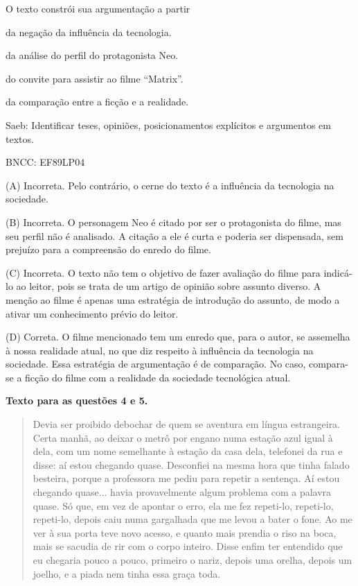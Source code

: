 O texto constrói sua argumentação a partir

\begin{escolha}
\item da negação da influência da tecnologia.

\item da análise do perfil do protagonista Neo.

\item do convite para assistir ao filme ``Matrix''.

\item da comparação entre a ficção e a realidade.
\end{escolha}

Saeb: Identificar teses, opiniões, posicionamentos explícitos e
argumentos em textos.

BNCC: EF89LP04

(A) Incorreta. Pelo contrário, o cerne do texto é a influência da
tecnologia na sociedade.

(B) Incorreta. O personagem Neo é citado por ser o protagonista do
filme, mas seu perfil não é analisado. A citação a ele é curta e poderia
ser dispensada, sem prejuízo para a compreensão do enredo do filme.

(C) Incorreta. O texto não tem o objetivo de fazer avaliação do filme
para indicá-lo ao leitor, pois se trata de um artigo de opinião sobre
assunto diverso. A menção ao filme é apenas uma estratégia de introdução
do assunto, de modo a ativar um conhecimento prévio do leitor.

(D) Correta. O filme mencionado tem um enredo que, para o autor, se
assemelha à nossa realidade atual, no que diz respeito à influência da
tecnologia na sociedade. Essa estratégia de argumentação é de
comparação. No caso, compara-se a ficção do filme com a realidade da
sociedade tecnológica atual.

\textbf{Texto para as questões 4 e 5.}

\begin{quote}
Devia ser proibido debochar de quem se aventura em língua estrangeira.
Certa manhã, ao deixar o metrô por engano numa estação azul igual à
dela, com um nome semelhante à estação da casa dela, telefonei da rua e
disse: aí estou chegando quase. Desconfiei na mesma hora que tinha
falado besteira, porque a professora me pediu para repetir a sentença.
Aí estou chegando quase... havia provavelmente algum problema com a
palavra quase. Só que, em vez de apontar o erro, ela me fez repeti-lo,
repeti-lo, repeti-lo, depois caiu numa gargalhada que me levou a bater o
fone. Ao me ver à sua porta teve novo acesso, e quanto mais prendia o
riso na boca, mais se sacudia de rir com o corpo inteiro. Disse enfim
ter entendido que eu chegaria pouco a pouco, primeiro o nariz, depois
uma orelha, depois um joelho, e a piada nem tinha essa graça toda.
\end{quote}

